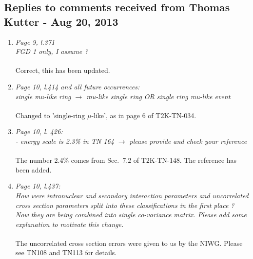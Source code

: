 \subsection{
  Replies to comments received from Thomas Kutter - Aug 20, 2013 }

\begin{enumerate}

  \vspace{5 mm}
\item
  {\em
    Page 9, l.371\\
    FGD 1 only, I assume ?
  }\\
  \\
  Correct, this has been updated.

  \vspace{5 mm}
\item
  {\em
    Page 10, l.414 and all future occurrences:\\
    single mu-like ring $\rightarrow$ mu-like single ring OR single ring mu-like event  
  }\\
  \\
  Changed to 'single-ring $\mu$-like', as in page 6 of T2K-TN-034. 
  
  \vspace{5 mm}
\item
  {\em
    Page 10, l. 426:\\
    - energy scale is 2.3\% in TN 164 $\rightarrow$ please provide and check your reference
  }\\
  \\
  The number 2.4\% comes from Sec.\ 7.2 of T2K-TN-148.
  The reference has been added.
  
  \vspace{5 mm}
\item
  {\em
    Page 10, l.437:\\
    How were intranuclear and secondary interaction parameters and uncorrelated cross section parameters split
    into these classifications in the first place ? 
    Now they are being combined into single co-variance matrix. Please add some explanation to motivate this change.
  }\\
  \\
  The uncorrelated cross section errors were given to us by the NIWG.
  Please see TN108 and TN113 for details.


\end{enumerate}
